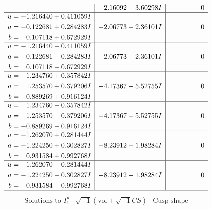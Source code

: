 \documentclass[1p]{elsarticle_modified}
\theoremstyle{definition}
\newcommand{\I}{\sqrt{-1}}
\begin{document}
$$\begin{array}{c|c|c}
 & \phantom{-}2.16092 - 3.60298 I & \phantom{-0.000000 } 0 \\ \hline\begin{aligned}
u &= -1.216440 + 0.411059 I \\
a &= -0.122681 + 0.284283 I \\
b &= \phantom{-}0.107118 + 0.672929 I\end{aligned}
 & -2.06773 + 2.36101 I & \phantom{-0.000000 } 0 \\ \hline\begin{aligned}
u &= -1.216440 - 0.411059 I \\
a &= -0.122681 - 0.284283 I \\
b &= \phantom{-}0.107118 - 0.672929 I\end{aligned}
 & -2.06773 - 2.36101 I & \phantom{-0.000000 } 0 \\ \hline\begin{aligned}
u &= \phantom{-}1.234760 + 0.357842 I \\
a &= \phantom{-}1.253570 + 0.379206 I \\
b &= -0.889269 + 0.916124 I\end{aligned}
 & -4.17367 - 5.52755 I & \phantom{-0.000000 } 0 \\ \hline\begin{aligned}
u &= \phantom{-}1.234760 - 0.357842 I \\
a &= \phantom{-}1.253570 - 0.379206 I \\
b &= -0.889269 - 0.916124 I\end{aligned}
 & -4.17367 + 5.52755 I & \phantom{-0.000000 } 0 \\ \hline\begin{aligned}
u &= -1.262070 + 0.281444 I \\
a &= -1.224250 + 0.302827 I \\
b &= \phantom{-}0.931584 + 0.992768 I\end{aligned}
 & -8.23912 + 1.98284 I & \phantom{-0.000000 } 0 \\ \hline\begin{aligned}
u &= -1.262070 - 0.281444 I \\
a &= -1.224250 - 0.302827 I \\
b &= \phantom{-}0.931584 - 0.992768 I\end{aligned}
 & -8.23912 - 1.98284 I & \phantom{-0.000000 } 0\\
 \hline 
 \end{array}$$\newpage$$\begin{array}{c|c|c}  
\text{Solutions to }I^u_{1}& \I (\text{vol} + \sqrt{-1}CS) & \text{Cusp shape}\\

\end{array}$$
\end{document}
